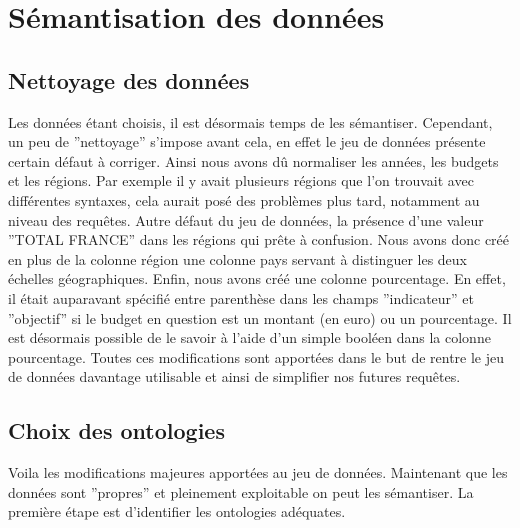 \documentclass[a4paper,sffamily,12pt]{article}
\begin{document}
		\vspace{0.5cm}
		
	\section{Sémantisation des données}				

		\vspace{0.5cm}
		
		\subsection{Nettoyage des données}
			
			\vspace{0.5cm}
			
			Les données étant choisis, il est désormais temps de les sémantiser. Cependant, un peu de ''nettoyage'' s'impose avant cela, en effet le jeu de données présente certain défaut à corriger. Ainsi nous avons dû normaliser les années, les budgets et les régions. Par exemple il y avait plusieurs régions que l'on trouvait avec différentes syntaxes, cela aurait posé des problèmes plus tard, notamment au niveau des requêtes. Autre défaut du jeu de données, la présence d'une valeur ''TOTAL FRANCE'' dans les régions qui prête à confusion. Nous avons donc créé en plus de la colonne région une colonne pays servant à distinguer les deux échelles géographiques. Enfin, nous avons créé une colonne pourcentage. En effet, il était auparavant spécifié entre parenthèse dans les champs ''indicateur'' et ''objectif'' si le budget en question est un montant (en euro) ou un pourcentage. Il est désormais possible de le savoir à l'aide d'un simple booléen dans la colonne pourcentage. Toutes ces modifications sont apportées dans le but de rentre le jeu de données davantage utilisable et ainsi de simplifier nos futures requêtes.
		
			\vspace{0.5cm}
		
		\subsection{Choix des ontologies}
		
			\vspace{0.5cm}
			
			Voila les modifications majeures apportées au jeu de données. Maintenant que les données sont ''propres'' et pleinement exploitable on peut les sémantiser. La première étape est d'identifier les ontologies adéquates. \\
		
\end{document}
